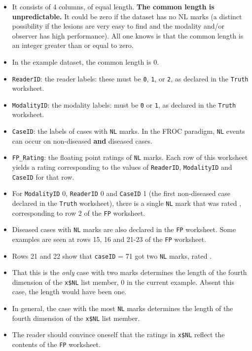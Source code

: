 \documentclass[
]{book}
\providecommand{\tightlist}{%
  \setlength{\itemsep}{0pt}\setlength{\parskip}{0pt}}
\begin{document}
\begin{itemize}
\tightlist
\item
  It consists of 4 columns, of equal length. \textbf{The common length is unpredictable.} It could be zero if the dataset has no NL marks (a distinct possibility if the lesions are very easy to find and the modality and/or observer has high performance). All one knows is that the common length is an integer greater than or equal to zero.
\item
  In the example dataset, the common length is 0.
\item
  \texttt{ReaderID}: the reader labels: these must be \texttt{0}, \texttt{1}, or \texttt{2}, as declared in the \texttt{Truth} worksheet.
\item
  \texttt{ModalityID}: the modality labels: must be \texttt{0} or \texttt{1}, as declared in the \texttt{Truth} worksheet.
\item
  \texttt{CaseID}: the labels of cases with \texttt{NL} marks. In the FROC paradigm, \texttt{NL} events can occur on non-diseased \textbf{and} diseased cases.
\item
  \texttt{FP\_Rating}: the floating point ratings of \texttt{NL} marks. Each row of this worksheet yields a rating corresponding to the values of \texttt{ReaderID}, \texttt{ModalityID} and \texttt{CaseID} for that row.
\item
  For \texttt{ModalityID} 0, \texttt{ReaderID} 0 and \texttt{CaseID} 1 (the first non-diseased case declared in the \texttt{Truth} worksheet), there is a single \texttt{NL} mark that was rated , corresponding to row 2 of the \texttt{FP} worksheet.
\item
  Diseased cases with \texttt{NL} marks are also declared in the \texttt{FP} worksheet. Some examples are seen at rows 15, 16 and 21-23 of the \texttt{FP} worksheet.
\item
  Rows 21 and 22 show that \texttt{caseID} = 71 got two \texttt{NL} marks, rated .
\item
  That this is the \emph{only} case with two marks determines the length of the fourth dimension of the \texttt{x\$NL} list member, 0 in the current example. Absent this case, the length would have been one.
\item
  In general, the case with the most \texttt{NL} marks determines the length of the fourth dimension of the \texttt{x\$NL} list member.
\item
  The reader should convince oneself that the ratings in \texttt{x\$NL} reflect the contents of the \texttt{FP} worksheet.
\end{itemize}
\end{document}
